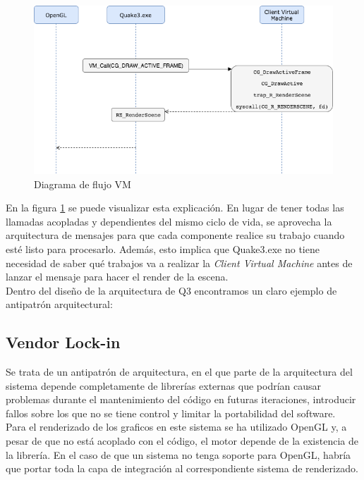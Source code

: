 \documentclass[a4paper,12pt]{report}
\begin{document}
    \begin{center}
    	\begin{figure}[h]
    		\includegraphics[width=1\textwidth]{images/diagrama.png}
    		\caption{Diagrama de flujo VM}
    		\label{figdiagrama}
    	\end{figure}
    \end{center}
    
    En la figura \ref{figdiagrama} se puede visualizar esta explicación. En lugar de tener todas las llamadas acopladas y dependientes del mismo ciclo de vida, se aprovecha la arquitectura de mensajes para que cada componente realice su trabajo cuando esté listo para procesarlo. Además, esto implica que Quake3.exe no tiene necesidad de saber qué trabajos va a realizar la \textit{Client Virtual Machine} antes de lanzar el mensaje para hacer el render de la escena.\\

    Dentro del diseño de la arquitectura de Q3 encontramos un claro ejemplo de antipatrón arquitectural:
    
    \subsection{Vendor Lock-in}
    
    Se trata de un antipatrón de arquitectura, en el que parte de la arquitectura del sistema depende completamente de librerías externas que podrían causar problemas durante el mantenimiento del código en futuras iteraciones, introducir fallos sobre los que no se tiene control y limitar la portabilidad del software.\\
    
    Para el renderizado de los graficos en este sistema se ha utilizado OpenGL y, a pesar de que no está acoplado con el código, el motor depende de la existencia de la librería. En el caso de que un sistema no tenga soporte para OpenGL, habría que portar toda la capa de integración al correspondiente sistema de renderizado.  \\
  
\end{document}
